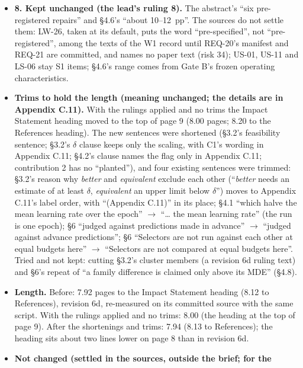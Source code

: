 \documentclass{article}
\theoremstyle{plain}
\theoremstyle{definition}
\theoremstyle{remark}
\begin{document}
\begin{itemize}
        funding-gated; first 7--8B model cut] (conflict 84).
  \item \textbf{8. Kept unchanged (the lead's ruling 8).} The abstract's ``six
        pre-registered repairs'' and \S{}4.6's ``about 10--12~pp''. The sources
        do not settle them: LW-26, taken at its default, puts the word
        ``pre-specified'', not ``pre-registered'', among the texts of the W1
        record until REQ-20's manifest and REQ-21 are committed, and names no
        paper text (risk 34); US-01, US-11 and LS-06 stay S1 items; \S{}4.6's
        range comes from Gate B's frozen operating characteristics.
  \item \textbf{Trims to hold the length (meaning unchanged; the details are in
        Appendix C.11).} With the rulings applied and no trims the Impact
        Statement heading moved to the top of page 9 (8.00 pages; 8.20 to the
        References heading). The new sentences were shortened (\S{}3.2's
        feasibility sentence; \S{}3.2's $\delta$ clause keeps only the scaling,
        with C1's wording in Appendix C.11; \S{}4.2's clause names the flag only
        in Appendix C.11; contribution 2 has no ``planted''), and four existing
        sentences were trimmed: \S{}3.2's reason why \emph{better} and
        \emph{equivalent} exclude each other (``\emph{better} needs an estimate
        of at least $\delta$, \emph{equivalent} an upper limit below $\delta$'')
        moves to Appendix C.11's label order, with ``(Appendix C.11)'' in its
        place; \S{}4.1 ``which halve the mean learning rate over the epoch''
        $\to$ ``\ldots{} the mean learning rate'' (the run is one epoch); \S{}6
        ``judged against predictions made in advance'' $\to$ ``judged against
        advance predictions''; \S{}6 ``Selectors are not run against each other
        at equal budgets here'' $\to$ ``Selectors are not compared at equal
        budgets here''. Tried and not kept: cutting \S{}3.2's cluster members (a
        revision 6d ruling text) and \S{}6's repeat of ``a family difference is
        claimed only above its MDE'' (\S{}4.8).
  \item \textbf{Length.} Before: 7.92 pages to the Impact Statement heading
        (8.12 to References), revision 6d, re-measured on its committed source
        with the same script. With the rulings applied and no trims: 8.00 (the
        heading at the top of page 9). After the shortenings and trims: 7.94
        (8.13 to References); the heading sits about two lines lower on page 8
        than in revision 6d.
  \item \textbf{Not changed (settled in the sources, outside the brief; for the
}
\end{itemize}
\end{document}
